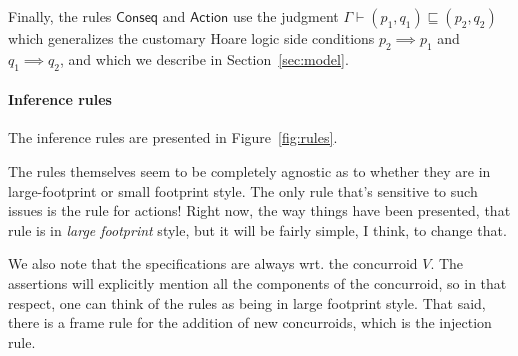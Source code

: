 Finally, the rules $\mathsf{Conseq}$ and $\mathsf{Action}$ use the
judgment $\Gamma \vdash (p_1, q_1) \sqsubseteq (p_2, q_2)$ which
generalizes the customary Hoare logic side conditions $p_2 \implies
p_1$ and $q_1 \implies q_2$, and which we describe in
Section~\ref{sec:model}.

\paragraph{Inference rules}

The inference rules are presented in Figure~\ref{fig:rules}. 

The rules themselves seem to be completely agnostic as to whether they
are in large-footprint or small footprint style. The only rule that's
sensitive to such issues is the rule for actions! Right now, the way
things have been presented, that rule is in \emph{large footprint}
style, but it will be fairly simple, I think, to change that.

We also note that the specifications are always wrt. the concurroid
$V$. The assertions will explicitly mention all the components of the
concurroid, so in that respect, one can think of the rules as being in
large footprint style. That said, there is a frame rule for the
addition of new concurroids, which is the injection rule.

